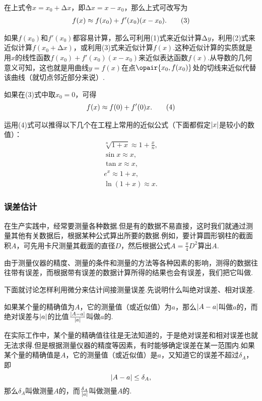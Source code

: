 在上式令\(x = x_0 + \increment x\)，即\(\increment x = x - x_0\)，那么上式可改写为\begin{gather}
f(x) \approx f(x_0) + f'(x_0) (x - x_0). \tag3
\end{gather}

如果\(f(x_0)\)和\(f'(x_0)\)都容易计算，那么可利用(1)式来近似计算\(\increment y\)，利用(2)式来近似计算\(f(x_0 + \increment x)\)，或利用(3)式来近似计算\(f(x)\).这种近似计算的实质就是用\(x\)的线性函数\(f(x_0) + f'(x_0) (x - x_0)\)来近似表达函数\(f(x)\).从导数的几何意义可知，这也就是用曲线\(y=f(x)\)在点\(\opair{x_0,f(x_0)}\)处的切线来近似代替该曲线（就切点邻近部分来说）.

如果在(3)式中取\(x_0 = 0\)，可得\begin{gather}
f(x) \approx f(0) + f'(0) x. \tag4
\end{gather}

运用(4)式可以推得以下几个在工程上常用的近似公式（下面都假定\(\abs{x}\)是较小的数值）：
\begin{gather}
\sqrt[n]{1+x} \approx 1 + \frac{x}{n}, \\
\sin x \approx x, \\
\tan x \approx x, \\
e^x \approx 1 + x, \\
\ln (1 + x) \approx x.
\end{gather}

\subsubsection{误差估计}
在生产实践中，经常要测量各种数据.但是有的数据不易直接，这时我们就通过测量其他有关数据后，根据某种公式算出所要的数据.例如，要计算圆形钢柱的截面积\(A\)，可先用卡尺测量其截面的直径\(D\)，然后根据公式\(A = \frac{\pi}{4} D^2\)算出\(A\).

由于测量仪器的精度、测量的条件和测量的方法等各种因素的影响，测得的数据往往带有误差，而根据带有误差的数据计算所得的结果也会有误差，我们把它叫做.

下面就讨论怎样利用微分来估计间接测量误差.先说明什么叫绝对误差、相对误差.

如果某个量的精确值为\(A\)，它的测量值（或近似值）为\(a\)，那么\(\abs{A-a}\)叫做\(a\)的，而绝对误差与\(\abs{a}\)的比值\(\frac{\abs{A-a}}{\abs{a}}\)叫做\(a\)的.

在实际工作中，某个量的精确值往往是无法知道的，于是绝对误差和相对误差也就无法求得.但是根据测量仪器的精度等因素，有时能够确定误差在某一范围内.如果某个量的精确值是\(A\)，它的测量值（或近似值）是\(a\)，又知道它的误差不超过\(\delta_A\)，即\[
\abs{A-a} \leq \delta_A,
\]那么\(\delta_A\)叫做测量\(A\)的，而\(\frac{\delta_A}{\abs{a}}\)叫做测量\(A\)的.

